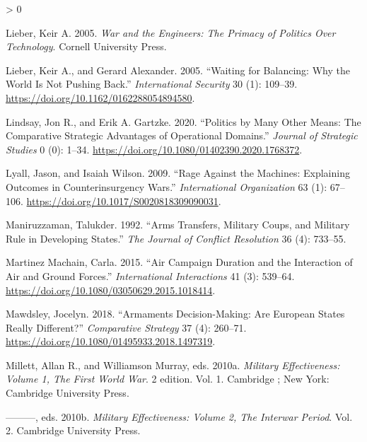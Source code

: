 \documentclass[
]{article}
\newlength{\cslhangindent}
\newenvironment{CSLReferences}[2] %
 {%
  \setlength{\parindent}{0pt}
  \ifodd #1 \everypar{\setlength{\hangindent}{\cslhangindent}}\ignorespaces\fi
  \ifnum #2 > 0
  \setlength{\parskip}{#2\baselineskip}
  \fi
 }%
 {}
\begin{document}
\begin{CSLReferences}{1}{0}
\leavevmode\hypertarget{ref-lieber_warengineersprimacy_2005}{}%
Lieber, Keir A. 2005. \emph{War and the {Engineers}: {The Primacy} of {Politics Over Technology}}. {Cornell University Press}.

\leavevmode\hypertarget{ref-lieber_waitingbalancingwhy_2005}{}%
Lieber, Keir A., and Gerard Alexander. 2005. {``Waiting for {Balancing}: {Why} the {World Is Not Pushing Back}.''} \emph{International Security} 30 (1): 109--39. \url{https://doi.org/10.1162/0162288054894580}.

\leavevmode\hypertarget{ref-lindsay_politicsmanyother_2020}{}%
Lindsay, Jon R., and Erik A. Gartzke. 2020. {``Politics by Many Other Means: {The} Comparative Strategic Advantages of Operational Domains.''} \emph{Journal of Strategic Studies} 0 (0): 1--34. \url{https://doi.org/10.1080/01402390.2020.1768372}.

\leavevmode\hypertarget{ref-lyall_ragemachinesexplaining_2009}{}%
Lyall, Jason, and Isaiah Wilson. 2009. {``Rage {Against} the {Machines}: {Explaining Outcomes} in {Counterinsurgency Wars}.''} \emph{International Organization} 63 (1): 67--106. \url{https://doi.org/10.1017/S0020818309090031}.

\leavevmode\hypertarget{ref-maniruzzaman_armstransfersmilitary_1992}{}%
Maniruzzaman, Talukder. 1992. {``Arms {Transfers}, {Military Coups}, and {Military Rule} in {Developing States}.''} \emph{The Journal of Conflict Resolution} 36 (4): 733--55.

\leavevmode\hypertarget{ref-martinezmachain_aircampaignduration_2015}{}%
Martinez Machain, Carla. 2015. {``Air {Campaign Duration} and the {Interaction} of {Air} and {Ground Forces}.''} \emph{International Interactions} 41 (3): 539--64. \url{https://doi.org/10.1080/03050629.2015.1018414}.

\leavevmode\hypertarget{ref-mawdsley_armamentsdecisionmakingare_2018}{}%
Mawdsley, Jocelyn. 2018. {``Armaments Decision-Making: {Are European} States Really Different?''} \emph{Comparative Strategy} 37 (4): 260--71. \url{https://doi.org/10.1080/01495933.2018.1497319}.

\leavevmode\hypertarget{ref-millett_militaryeffectivenessvolume_2010}{}%
Millett, Allan R., and Williamson Murray, eds. 2010a. \emph{Military {Effectiveness}: {Volume} 1, {The First World War}}. 2 edition. Vol. 1. {Cambridge ; New York}: {Cambridge University Press}.

\leavevmode\hypertarget{ref-millett_militaryeffectivenessvolume_2010a}{}%
---------, eds. 2010b. \emph{Military {Effectiveness}: {Volume} 2, {The Interwar Period}}. Vol. 2. {Cambridge University Press}.


\end{CSLReferences}
\end{document}
